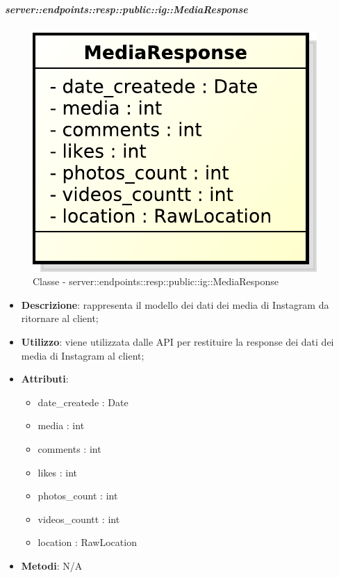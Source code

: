     \subparagraph{server::endpoints::resp::public::ig::MediaResponse} %
    \label{subp:bdsm_app_server_endpoints_resp_public_ig_mediaresponse}
	\begin{figure}[!htbp]
		\centering
		\centerline{\includegraphics[scale=0.6]{./images/server/classes/endpoints/ig/media_response.pdf}}
		\caption{Classe - server::endpoints::resp::public::ig::MediaResponse}
	\end{figure}
    \begin{itemize}
      \item \textbf{Descrizione}: rappresenta il modello dei dati dei media di Instagram da ritornare al client;
      \item \textbf{Utilizzo}: viene utilizzata dalle API per restituire la response dei dati dei media di Instagram al client;

	  \item \textbf{Attributi}:
	  	\begin{itemize}
	  		\item date\_createde : Date
	  		\item media : int
	  		\item comments : int
	  		\item likes : int
	  		\item photos\_count : int
	  		\item videos\_countt : int
	  		\item location : RawLocation
	  	\end{itemize}
	  \item \textbf{Metodi}: N/A
      \end{itemize}

